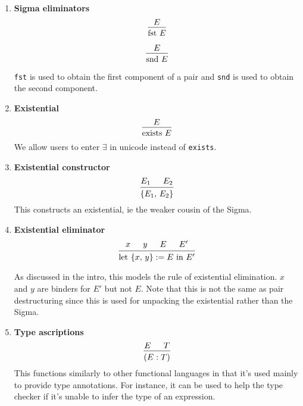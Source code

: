 \documentclass{article}
\begin{document}
\begin{enumerate}
  \item \textbf{Sigma eliminators} \\
  \[
    \begin{prooftree}
      \hypo{E}
      \infer1{\fst \, E}
    \end{prooftree}
  \]

  \[
   \begin{prooftree}
    \hypo{E}
    \infer1{\snd \, E}
   \end{prooftree}
 \]
 
 \verb|fst| is used to obtain the first component of a pair and \verb|snd| is used
 to obtain the second component.

 \item \textbf{Existential} \\
  \[
  \begin{prooftree}
    \hypo{E}
    \infer1{\text{exists } E}
  \end{prooftree}   
  \]
  We allow users to enter $\exists$ in unicode instead of \verb|exists|.

 \item \textbf{Existential constructor} \\
 \[
  \begin{prooftree}
   \hypo{E_1}
   \hypo{E_2}
   \infer2{\{ E_1, \, E_2 \}} 
  \end{prooftree}  
 \]
 This constructs an existential, ie the weaker cousin of the Sigma.

 \item \textbf{Existential eliminator} \\
 \[
 \begin{prooftree}
  \hypo{x}
  \hypo{y}
  \hypo{E}
  \hypo{E'}
  \infer4{\text{let } \{x, \, y\} := E \text{ in } E'}
 \end{prooftree}  
 \]

 As discussed in the intro, this models the rule of existential elimination.
 $x$ and $y$ are binders for $E'$ but not $E$.
 Note that this is not the same as pair destructuring since this is used for
 unpacking the existential rather than the Sigma.

\item \textbf{Type ascriptions} \\
  \[
    \begin{prooftree}
      \hypo{E}
      \hypo{T}
      \infer2{(E : T)}
    \end{prooftree}
  \]
  This functions similarly to other functional languages in that it's used
  mainly to provide type annotations. For instance, it can be used to help the
  type checker if it's unable to infer the type of an expression.


\end{enumerate}
\end{document}
